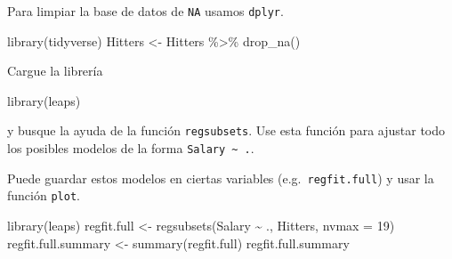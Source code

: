 \documentclass[
  12pt,
]{book}
\newenvironment{Shaded}{\begin{snugshade}}{\end{snugshade}}
\newcommand{\AttributeTok}[1]{\textcolor[rgb]{0.77,0.63,0.00}{#1}}
\newcommand{\DecValTok}[1]{\textcolor[rgb]{0.00,0.00,0.81}{#1}}
\newcommand{\FunctionTok}[1]{\textcolor[rgb]{0.00,0.00,0.00}{#1}}
\newcommand{\NormalTok}[1]{#1}
\newcommand{\OtherTok}[1]{\textcolor[rgb]{0.56,0.35,0.01}{#1}}
\newcommand{\SpecialCharTok}[1]{\textcolor[rgb]{0.00,0.00,0.00}{#1}}
\theoremstyle{definition}
\theoremstyle{definition}
\theoremstyle{definition}
\theoremstyle{definition}
\theoremstyle{remark}
\begin{document}
Para limpiar la base de datos de \texttt{NA} usamos \texttt{dplyr}.

\begin{Shaded}
\begin{Highlighting}[]
\FunctionTok{library}\NormalTok{(tidyverse)}
\NormalTok{Hitters }\OtherTok{\textless{}{-}}\NormalTok{ Hitters }\SpecialCharTok{\%\textgreater{}\%}
    \FunctionTok{drop\_na}\NormalTok{()}
\end{Highlighting}
\end{Shaded}

Cargue la librería

\begin{Shaded}
\begin{Highlighting}[]
\FunctionTok{library}\NormalTok{(leaps)}
\end{Highlighting}
\end{Shaded}

y busque la ayuda de la función \texttt{regsubsets}. Use esta función para ajustar todo los posibles modelos de la forma \texttt{Salary\ \textasciitilde{}\ .}.

Puede guardar estos modelos en ciertas variables (e.g.~\texttt{regfit.full}) y usar la función \texttt{plot}.

\begin{Shaded}
\begin{Highlighting}[]
\FunctionTok{library}\NormalTok{(leaps)}
\NormalTok{regfit.full }\OtherTok{\textless{}{-}} \FunctionTok{regsubsets}\NormalTok{(Salary }\SpecialCharTok{\textasciitilde{}}\NormalTok{ ., Hitters, }\AttributeTok{nvmax =} \DecValTok{19}\NormalTok{)}
\NormalTok{regfit.full.summary }\OtherTok{\textless{}{-}} \FunctionTok{summary}\NormalTok{(regfit.full)}
\NormalTok{regfit.full.summary}
\end{Highlighting}
\end{Shaded}
\end{document}
